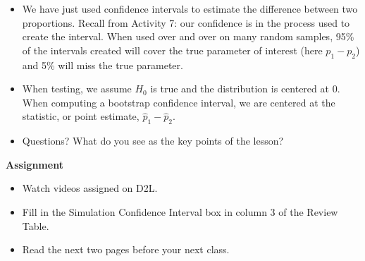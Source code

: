 \begin{itemize}
  \item We have just used confidence intervals 
    to estimate the difference between two proportions.  Recall from
    Activity 7: our confidence is in the process used to create the
    interval.  When used over and over on many random samples, 95\% of
    the intervals created will cover the true parameter of interest
    (here $p_1 - p_2$) and 5\% will miss the true parameter.

  \item When testing, we assume $H_0$ is true and the distribution is
    centered at 0.  When computing a bootstrap confidence interval, we
    are centered at the statistic, or point estimate, $\widehat{p}_1 -
    \widehat{p}_2$. 
 \item 
  Questions? What do you see as the key points of the lesson? \vfill

  \end{itemize}






\noindent
{\bf Assignment} \vspace{-.2in}
\begin{itemize}
\item Watch videos assigned on D2L.
\item Fill in the Simulation Confidence Interval box in column 3 of
  the Review Table. 
\item Read the next two pages before your next class.
\end{itemize}

